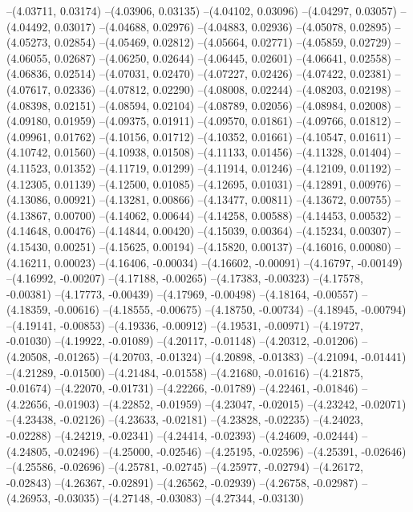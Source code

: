 --(4.03711, 0.03174)
--(4.03906, 0.03135)
--(4.04102, 0.03096)
--(4.04297, 0.03057)
--(4.04492, 0.03017)
--(4.04688, 0.02976)
--(4.04883, 0.02936)
--(4.05078, 0.02895)
--(4.05273, 0.02854)
--(4.05469, 0.02812)
--(4.05664, 0.02771)
--(4.05859, 0.02729)
--(4.06055, 0.02687)
--(4.06250, 0.02644)
--(4.06445, 0.02601)
--(4.06641, 0.02558)
--(4.06836, 0.02514)
--(4.07031, 0.02470)
--(4.07227, 0.02426)
--(4.07422, 0.02381)
--(4.07617, 0.02336)
--(4.07812, 0.02290)
--(4.08008, 0.02244)
--(4.08203, 0.02198)
--(4.08398, 0.02151)
--(4.08594, 0.02104)
--(4.08789, 0.02056)
--(4.08984, 0.02008)
--(4.09180, 0.01959)
--(4.09375, 0.01911)
--(4.09570, 0.01861)
--(4.09766, 0.01812)
--(4.09961, 0.01762)
--(4.10156, 0.01712)
--(4.10352, 0.01661)
--(4.10547, 0.01611)
--(4.10742, 0.01560)
--(4.10938, 0.01508)
--(4.11133, 0.01456)
--(4.11328, 0.01404)
--(4.11523, 0.01352)
--(4.11719, 0.01299)
--(4.11914, 0.01246)
--(4.12109, 0.01192)
--(4.12305, 0.01139)
--(4.12500, 0.01085)
--(4.12695, 0.01031)
--(4.12891, 0.00976)
--(4.13086, 0.00921)
--(4.13281, 0.00866)
--(4.13477, 0.00811)
--(4.13672, 0.00755)
--(4.13867, 0.00700)
--(4.14062, 0.00644)
--(4.14258, 0.00588)
--(4.14453, 0.00532)
--(4.14648, 0.00476)
--(4.14844, 0.00420)
--(4.15039, 0.00364)
--(4.15234, 0.00307)
--(4.15430, 0.00251)
--(4.15625, 0.00194)
--(4.15820, 0.00137)
--(4.16016, 0.00080)
--(4.16211, 0.00023)
--(4.16406, -0.00034)
--(4.16602, -0.00091)
--(4.16797, -0.00149)
--(4.16992, -0.00207)
--(4.17188, -0.00265)
--(4.17383, -0.00323)
--(4.17578, -0.00381)
--(4.17773, -0.00439)
--(4.17969, -0.00498)
--(4.18164, -0.00557)
--(4.18359, -0.00616)
--(4.18555, -0.00675)
--(4.18750, -0.00734)
--(4.18945, -0.00794)
--(4.19141, -0.00853)
--(4.19336, -0.00912)
--(4.19531, -0.00971)
--(4.19727, -0.01030)
--(4.19922, -0.01089)
--(4.20117, -0.01148)
--(4.20312, -0.01206)
--(4.20508, -0.01265)
--(4.20703, -0.01324)
--(4.20898, -0.01383)
--(4.21094, -0.01441)
--(4.21289, -0.01500)
--(4.21484, -0.01558)
--(4.21680, -0.01616)
--(4.21875, -0.01674)
--(4.22070, -0.01731)
--(4.22266, -0.01789)
--(4.22461, -0.01846)
--(4.22656, -0.01903)
--(4.22852, -0.01959)
--(4.23047, -0.02015)
--(4.23242, -0.02071)
--(4.23438, -0.02126)
--(4.23633, -0.02181)
--(4.23828, -0.02235)
--(4.24023, -0.02288)
--(4.24219, -0.02341)
--(4.24414, -0.02393)
--(4.24609, -0.02444)
--(4.24805, -0.02496)
--(4.25000, -0.02546)
--(4.25195, -0.02596)
--(4.25391, -0.02646)
--(4.25586, -0.02696)
--(4.25781, -0.02745)
--(4.25977, -0.02794)
--(4.26172, -0.02843)
--(4.26367, -0.02891)
--(4.26562, -0.02939)
--(4.26758, -0.02987)
--(4.26953, -0.03035)
--(4.27148, -0.03083)
--(4.27344, -0.03130)
